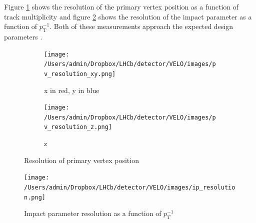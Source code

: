 Figure \ref{fig: pv resolution} shows the resolution of the primary vertex position as a function of track multiplicity and figure \ref{fig: ip resolution} shows the resolution of the impact parameter as a function of $p_\mathrm{T}^{-1}$. Both of these measurements approach the expected design parameters \cite{Latham:1491236}.


\begin{figure}[h]
	\centering
	\begin{subfigure}[b]{0.45\textwidth}
		\texttt{[image: /Users/admin/Dropbox/LHCb/detector/VELO/images/pv\_resolution\_xy.png]}
		\caption{x in red, y in blue}
	\end{subfigure}
	\begin{subfigure}[b]{0.45\textwidth}
		\texttt{[image: /Users/admin/Dropbox/LHCb/detector/VELO/images/pv\_resolution\_z.png]}
		\caption{z}
	\end{subfigure}
	\caption{Resolution of primary vertex position}
	\label{fig: pv resolution}
\end{figure}

\begin{figure}[h]
	\centering
	\texttt{[image: /Users/admin/Dropbox/LHCb/detector/VELO/images/ip\_resolution.png]}
	\caption{Impact parameter resolution as a function of $p_T^{-1}$}
	\label{fig: ip resolution}
\end{figure}

